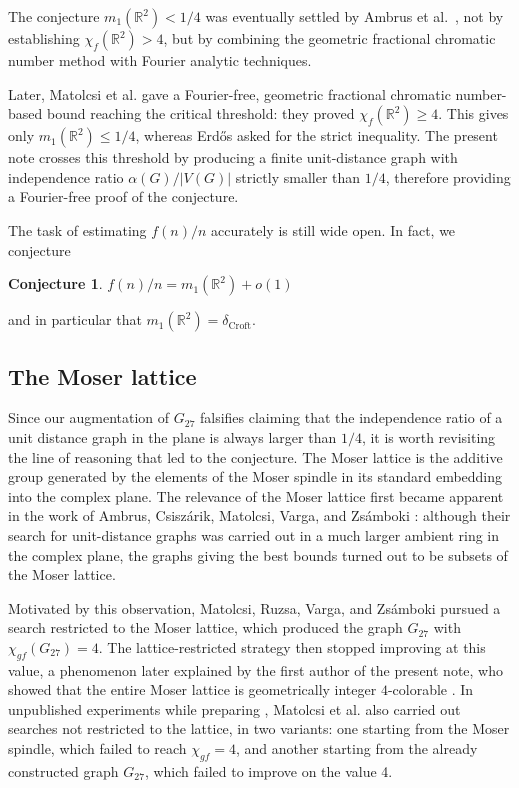 \documentclass[pdflatex,sn-mathphys-num]{sn-jnl}%
\newtheorem{conj}{Conjecture}
\begin{document}
The conjecture $m_1(\mathbb R^2)<1/4$ was eventually settled by Ambrus et al.~\cite{ACMVZ}, not by establishing $\chi_f(\mathbb R^2)>4$, but by combining the geometric fractional chromatic number method with Fourier analytic techniques.

Later, Matolcsi et al. \cite{MRVZ} gave a Fourier-free, geometric fractional chromatic number-based bound reaching the critical threshold: they proved $\chi_f(\mathbb R^2)\ge 4$. This gives only $m_1(\mathbb R^2)\le 1/4$, whereas Erdős asked for the strict inequality. The present note crosses this threshold by producing a finite unit-distance graph with independence ratio $\alpha(G)/|V(G)|$ strictly smaller than $1/4$, therefore providing a Fourier-free proof of the conjecture.

The task of estimating $f(n)/n$ accurately is still wide open. In fact, we conjecture

\begin{conj}
$f(n)/n = m_1(\mathbb R^2) + o(1)$%
\end{conj}
and in particular that $m_1(\mathbb R^2) = \delta_{\text{Croft}}$.

\subsection{The Moser lattice}

Since our augmentation of $G_{27}$ falsifies \cite[Conjecture 1]{MRVZ} claiming that the independence ratio of a unit distance graph in the plane is always larger than $1/4$, it is worth revisiting the line of reasoning that led to the conjecture. The Moser lattice is the additive group generated by the elements of the Moser spindle in its standard embedding into the complex plane. The relevance of the Moser lattice first became apparent in the work of Ambrus, Csiszárik, Matolcsi, Varga, and Zsámboki \cite{ACMVZ}: although their search for unit-distance graphs was carried out in a much larger ambient ring in the complex plane, the graphs giving the best bounds turned out to be subsets of the Moser lattice.

Motivated by this observation, Matolcsi, Ruzsa, Varga, and Zsámboki \cite{MRVZ} pursued a search restricted to the Moser lattice, which produced the graph $G_{27}$ with $\chi_{gf}(G_{27})=4$. The lattice-restricted strategy then stopped improving at this value, a phenomenon later explained by the first author of the present note, who showed that the entire Moser lattice is geometrically integer $4$-colorable \cite{DuczMoserLattice}. In unpublished experiments while preparing \cite{MRVZ}, Matolcsi et al. also carried out searches not restricted to the lattice, in two variants: one starting from the Moser spindle, which failed to reach $\chi_{gf}=4$, and another starting from the already constructed graph $G_{27}$, which failed to improve on the value 4.
\end{document}
